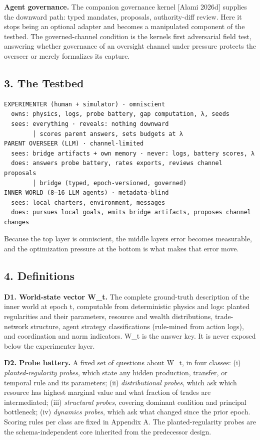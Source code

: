 \documentclass[11pt]{article}
\begin{document}
\textbf{Agent governance.} The companion governance kernel {[}Alami
2026d{]} supplies the downward path: typed mandates, proposals,
authority-diff review. Here it stops being an optional adapter and
becomes a manipulated component of the testbed. The governed-channel
condition is the kernel\textquotesingle s first adversarial field test,
answering whether governance of an oversight channel under pressure
protects the overseer or merely formalizes its capture.

\subsection{3. The Testbed}\label{3-the-testbed}

\begin{verbatim}
EXPERIMENTER (human + simulator) · omniscient
  owns: physics, logs, probe battery, gap computation, λ, seeds
  sees: everything · reveals: nothing downward
        │ scores parent answers, sets budgets at λ
PARENT OVERSEER (LLM) · channel-limited
  sees: bridge artifacts + own memory · never: logs, battery scores, λ
  does: answers probe battery, rates exports, reviews channel proposals
        │ bridge (typed, epoch-versioned, governed)
INNER WORLD (8–16 LLM agents) · metadata-blind
  sees: local charters, environment, messages
  does: pursues local goals, emits bridge artifacts, proposes channel changes
\end{verbatim}

Because the top layer is omniscient, the middle layer\textquotesingle s
error becomes measurable, and the optimization pressure at the bottom is
what makes that error move.

\subsection{4. Definitions}\label{4-definitions}

\textbf{D1. World-state vector W\_t.} The complete ground-truth
description of the inner world at epoch t, computable from deterministic
physics and logs: planted regularities and their parameters, resource
and wealth distributions, trade-network structure, agent strategy
classifications (rule-mined from action logs), and coordination and norm
indicators. W\_t is the answer key. It is never exposed below the
experimenter layer.

\textbf{D2. Probe battery.} A fixed set of questions about W\_t, in four
classes: (i) \emph{planted-regularity probes}, which state any hidden
production, transfer, or temporal rule and its parameters; (ii)
\emph{distributional probes}, which ask which resource has highest
marginal value and what fraction of trades are intermediated; (iii)
\emph{structural probes}, covering dominant coalition and principal
bottleneck; (iv) \emph{dynamics probes}, which ask what changed since
the prior epoch. Scoring rules per class are fixed in Appendix A. The
planted-regularity probes are the schema-independent core inherited from
the predecessor design.
\end{document}
